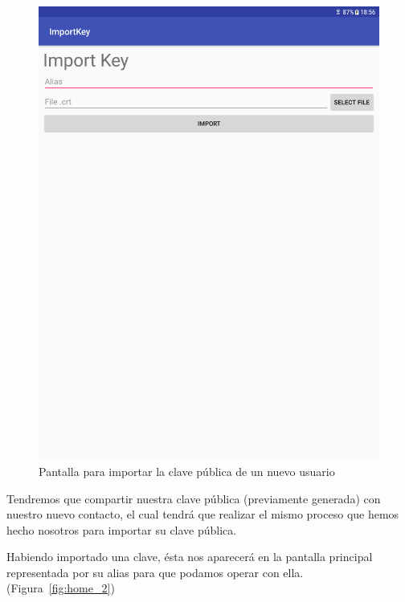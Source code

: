 \begin{figure}[ht]
  \centering
  \includegraphics[scale=0.2]{Figures/import}
  \decoRule
  \caption[Shatter (Importar clave pública)]{Pantalla para importar la clave
  pública de un nuevo usuario}
  \label{fig:import}
\end{figure}

Tendremos que compartir nuestra clave pública (previamente generada) con
nuestro nuevo contacto, el cual tendrá que realizar el mismo proceso que hemos
hecho nosotros para importar su clave pública.

Habiendo importado una clave, ésta nos aparecerá en la pantalla principal
representada por su alias para que podamos operar con ella.
(Figura~\ref{fig:home_2})

